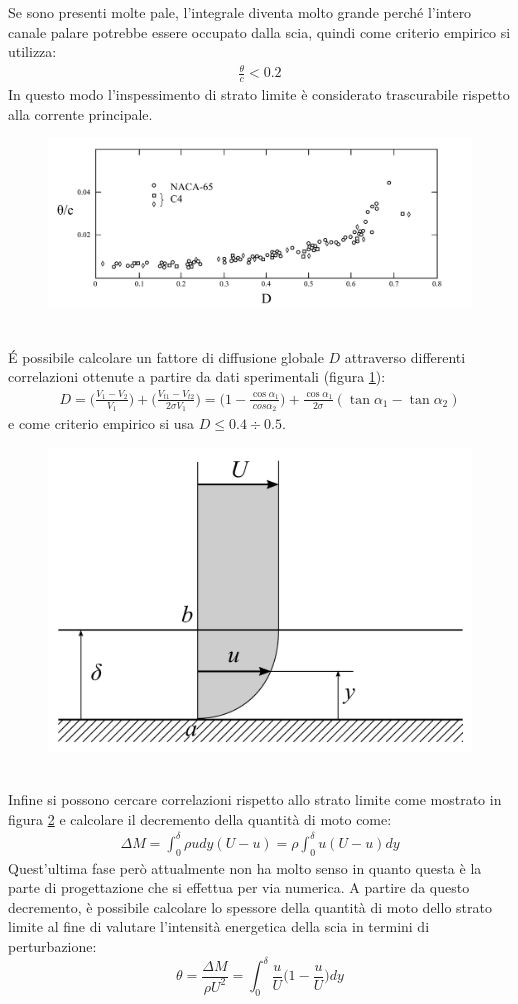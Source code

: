 Se sono presenti molte pale, l'integrale diventa molto grande perché l'intero canale palare potrebbe essere occupato dalla scia, quindi come criterio empirico si utilizza:
\begin{align*}
\frac{\theta}{c} < 0.2
\end{align*}
In questo modo l'inspessimento di strato limite è considerato trascurabile rispetto alla corrente principale. 
\begin{figure}
\centering
  \includegraphics[width=\textwidth]{fig/CritCarico3.pdf}
\caption{}
\label{fig:CritCarico3}
\end{figure}
\\\'E possibile calcolare un fattore di diffusione globale $D$ attraverso differenti correlazioni ottenute a partire da dati sperimentali (figura \ref{fig:CritCarico3}):
\begin{align*}
D = \bigg( \frac{V_1 - V_2}{V_1} \bigg) + \bigg( \frac{V_{t1} - V_{t2}}{2 \sigma V_1} \bigg) = \bigg( 1 - \frac{\cos \alpha_1}{cos \alpha_2} \bigg) + \frac{\cos \alpha_1}{2 \sigma} (\tan \alpha_1 - \tan \alpha_2)
\end{align*}
e come criterio empirico si usa $ D \leqslant 0.4 \div 0.5  $.
\begin{figure}
\centering
  \includegraphics[width=.4\textwidth]{fig/CritCarico4.pdf}
\caption{}
\label{fig:CritCarico4}
\end{figure}
\\Infine si possono cercare correlazioni rispetto allo strato limite come mostrato in figura \ref{fig:CritCarico4} e calcolare il decremento della quantità di moto come:
\begin{align*}
\Delta M = \int_0^{\delta} \rho u dy (U-u) = \rho \int_0^{\delta} u (U-u) dy
\end{align*} 
Quest'ultima fase però attualmente non ha molto senso in quanto questa è la parte di progettazione che si effettua per via numerica. A partire da questo decremento, è possibile calcolare lo spessore della quantità di moto dello strato limite al fine di valutare l'intensità energetica della scia in termini di perturbazione:
\begin{equation}
\theta = \frac{\Delta M}{\rho U^2} = \int_0^{\delta} \frac{u}{U} \bigg( 1 -\frac{u}{U} \bigg) dy
\end{equation}

